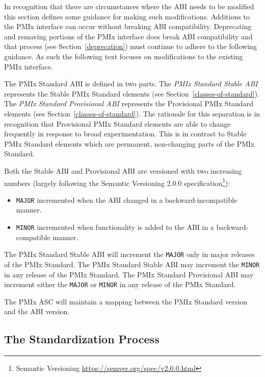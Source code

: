 \documentclass{article}
\begin{document}
In recognition that there are circumstances where the \ac{ABI} needs to be modified this section defines some guidance for making such modifications.
Additions to the PMIx interface can occur without breaking \ac{ABI} compatibility.
Deprecating and removing portions of the PMIx interface does break \ac{ABI} compatibility and that process (see Section~\ref{deprecation}) must continue to adhere to the following guidance.
As such the following text focuses on modifications to the existing PMIx interface.

The PMIx Standard ABI is defined in two parts.
The \textit{PMIx Standard Stable ABI} represents the Stable PMIx Standard elements (see Section~\ref{classes-of-standard}).
The \textit{PMIx Standard Provisional ABI} represents the Provisional PMIx Standard elements (see Section~\ref{classes-of-standard}).
The rationale for this separation is in recognition that Provisional PMIx Standard elements are able to change frequently in response to broad experimentation.
This is in contrast to Stable PMIx Standard elements which are permanent, non-changing parts of the PMIx Standard.

Both the Stable ABI and Provisional ABI are versioned with two increasing numbers (largely following the Semantic Versioning 2.0.0 specification\footnote{Semantic Versioning \url{https://semver.org/spec/v2.0.0.html}}):
\begin{itemize}
\item \texttt{MAJOR} incremented when the ABI changed in a backward-incompatible manner.
\item \texttt{MINOR} incremented when functionality is added to the ABI in a backward-compatible manner.
\end{itemize}

The PMIx Standard Stable ABI will increment the \texttt{MAJOR} only in major releases of the PMIx Standard.
The PMIx Standard Stable ABI may increment the \texttt{MINOR} in any release of the PMIx Standard.
The PMIx Standard Provisional ABI may increment either the \texttt{MAJOR} or \texttt{MINOR} in any release of the PMIx Standard.

The PMIx ASC will maintain a mapping between the PMIx Standard version and the ABI version.


\hypertarget{the-standardization-process}{%
\subsection{The Standardization Process}%
\label{the-standardization-process}}
\end{document}
